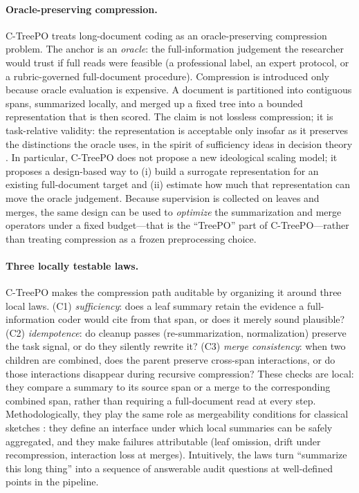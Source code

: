 \documentclass[11pt]{article}
\begin{document}
\paragraph{Oracle-preserving compression.}
C-TreePO treats long-document coding as an oracle-preserving compression problem. The anchor is an \emph{oracle}: the full-information judgement the researcher would trust if full reads were feasible (a professional label, an expert protocol, or a rubric-governed full-document procedure). Compression is introduced only because oracle evaluation is expensive. A document is partitioned into contiguous spans, summarized locally, and merged up a fixed tree into a bounded representation that is then scored. The claim is not lossless compression; it is task-relative validity: the representation is acceptable only insofar as it preserves the distinctions the oracle uses, in the spirit of sufficiency ideas in decision theory \citep{Blackwell1953}. In particular, C-TreePO does not propose a new ideological scaling model; it proposes a design-based way to (i) build a surrogate representation for an existing full-document target and (ii) estimate how much that representation can move the oracle judgement.
Because supervision is collected on leaves and merges, the same design can be used to \emph{optimize} the summarization and merge operators under a fixed budget---that is the ``TreePO'' part of C-TreePO---rather than treating compression as a frozen preprocessing choice.

\paragraph{Three locally testable laws.}
C-TreePO makes the compression path auditable by organizing it around three local laws. (C1) \emph{sufficiency}: does a leaf summary retain the evidence a full-information coder would cite from that span, or does it merely sound plausible? (C2) \emph{idempotence}: do cleanup passes (re-summarization, normalization) preserve the task signal, or do they silently rewrite it? (C3) \emph{merge consistency}: when two children are combined, does the parent preserve cross-span interactions, or do those interactions disappear during recursive compression? These checks are local: they compare a summary to its source span or a merge to the corresponding combined span, rather than requiring a full-document read at every step. Methodologically, they play the same role as mergeability conditions for classical sketches \citep{Agarwal2013MergeableTODS}: they define an interface under which local summaries can be safely aggregated, and they make failures attributable (leaf omission, drift under recompression, interaction loss at merges).
Intuitively, the laws turn ``summarize this long thing'' into a sequence of answerable audit questions at well-defined points in the pipeline.
\end{document}
